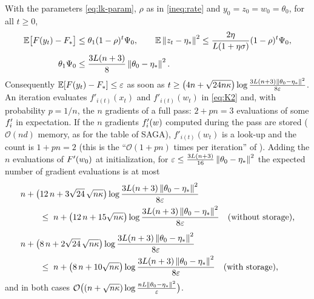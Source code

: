 \begin{corollary}\label{cor:lk-complexity}
With the parameters \eqref{eq:lk-param}, $\rho$ as in \eqref{ineq:rate} and $y_0=z_0=w_0=\theta_0$, for all $t\ge0$,
\begin{equation}\label{ineq:lk-values}
\begin{aligned}
\mathbb{E}\big[F(y_t)-F_\ast\big]&\le\theta_1(1-\rho)^t\Psi_0,\qquad \mathbb{E}\left\|z_t-\eta_\ast\right\|^2\le\frac{2\eta}{L(1+\eta\sigma)}(1-\rho)^t\Psi_0,\\
\theta_1\Psi_0&\le\frac{3L(n+3)}8\left\|\theta_0-\eta_\ast\right\|^2 .
\end{aligned}
\end{equation}
Consequently $\mathbb{E}[F(y_t)-F_\ast]\le\varepsilon$ as soon as $t\ge\big(4n+\sqrt{24n\kappa}\big)\log\frac{3L(n+3)\left\|\theta_0-\eta_\ast\right\|^2}{8\varepsilon}$. An iteration evaluates $f'_{i(t)}(x_t)$ and $f'_{i(t)}(w_t)$ in \eqref{eq:K2} and, with probability $p=1/n$, the $n$ gradients of a full pass: $2+pn=3$ evaluations of some $f'_i$ in expectation. If the $n$ gradients $f'_i(w)$ computed during the pass are stored ($\mathcal O(nd)$ memory, as for the table of SAGA), $f'_{i(t)}(w_t)$ is a look-up and the count is $1+pn=2$ (this is the ``$\mathcal O(1+pn)$ times per iteration'' of \cite{kovalev2020dont}). Adding the $n$ evaluations of $F'(w_0)$ at initialization, for $\varepsilon\le\frac{3L(n+3)}{16}\left\|\theta_0-\eta_\ast\right\|^2$ the expected number of gradient evaluations is at most
\begin{equation}\label{eq:lk-complexity}
\begin{aligned}
&n+\big(12\,n+3\sqrt{24}\,\sqrt{n\kappa}\big)\log\frac{3L(n+3)\left\|\theta_0-\eta_\ast\right\|^2}{8\varepsilon}\\
&\qquad\;\le\;n+\big(12\,n+15\sqrt{n\kappa}\big)\log\frac{3L(n+3)\left\|\theta_0-\eta_\ast\right\|^2}{8\varepsilon}\quad\text{(without storage),}\\[1ex]
&n+\big(8\,n+2\sqrt{24}\,\sqrt{n\kappa}\big)\log\frac{3L(n+3)\left\|\theta_0-\eta_\ast\right\|^2}{8\varepsilon}\\
&\qquad\;\le\;n+\big(8\,n+10\sqrt{n\kappa}\big)\log\frac{3L(n+3)\left\|\theta_0-\eta_\ast\right\|^2}{8\varepsilon}\quad\text{(with storage),}
\end{aligned}
\end{equation}
and in both cases $\mathcal O\big((n+\sqrt{n\kappa})\log\frac{nL\left\|\theta_0-\eta_\ast\right\|^2}{\varepsilon}\big)$.
\end{corollary}

